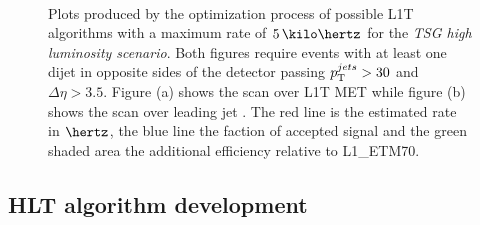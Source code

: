 \begin{figure}[!htp]%
\centering
{}\qquad
{}\\
\caption{Plots produced by the optimization process of possible \gls{L1T} algorithms with a maximum rate of $5\,\kilo\hertz$ for the \textit{\gls{TSG} high luminosity scenario}. Both figures require events with at least one dijet in opposite sides of the detector passing $p_{\mathrm{T}}^{jets}>30$ and $\Delta\eta>3.5$. Figure (a) shows the scan over \gls{L1T} \gls{MET} while figure (b) shows the scan over leading jet \pt. The red line is the estimated rate in $\hertz$, the blue line the faction of accepted signal and the green shaded area the additional efficiency relative to L1\_ETM70.}
\label{FIGURE:RunIIPreparation_L1TAlgorithmDevelopment_VariableScan}
\end{figure}

\subsection{HLT algorithm development}
\label{SECTION:RunIITriggerStudies_HLTAlgorithmDevelopment}

